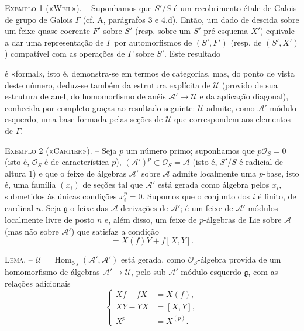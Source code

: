 \documentclass[11pt,twoside,openany]{book}
\numberwithin{equation}{section}
\newcommand{\src}[1]{%
  \phantomsection\hypertarget{src:#1}{}%
  \marginpar{\raggedleft\footnotesize\sffamily #1}%
}
\theoremstyle{plain}
\theoremstyle{definition}
\theoremstyle{remark}
\newcommand{\FgaUnitKey}{frontmatter}
\renewcommand{\src}[1]{%
  \phantomsection\hypertarget{src:\FgaUnitKey:#1}{}%
  \marginpar{\raggedleft\footnotesize\sffamily #1}%
}
\begin{document}
\textsc{Exemplo 1 («Weil»).} -- Suponhamos que $S'/S$ é um recobrimento étale
de Galois de grupo de Galois $\Gamma$ (cf. A, parágrafos 3 e 4.d). Então, um
dado de descida sobre um feixe quase-coerente $F'$ sobre $S'$ (resp. sobre um
$S'$-pré-esquema $X'$) equivale a dar uma representação de $\Gamma$ por
automorfismos de $(S',F')$ (resp. de $(S',X')$) compatível com as operações
de $\Gamma$ sobre $S'$. Este resultado

\src{321}
é «formal», isto é, demonstra-se em termos de categorias, mas, do
ponto de vista deste número, deduz-se também da estrutura explícita de
$\mathcal U$ (provido de sua estrutura de anel, do homomorfismo de anéis
$\mathcal A'\longrightarrow\mathcal U$ e da aplicação diagonal), conhecida
por completo graças ao resultado seguinte: $\mathcal U$ admite, como
$\mathcal A'$-módulo esquerdo, uma base formada pelas seções de
$\mathcal U$ que correspondem aos elementos de $\Gamma$.

\textsc{Exemplo 2 («Cartier»).} -- Seja $p$ um número primo; suponhamos que
$p\mathcal O_S=0$ (isto é, $\mathcal O_S$ é de característica $p$),
$(\mathcal A')^p\subset\mathcal O_S=\mathcal A$ (isto é, $S'/S$ é radicial
de altura 1) e que o feixe de álgebras $\mathcal A'$ sobre $\mathcal A$ admite
localmente uma $p$-base, isto é, uma família $(x_i)$ de seções tal que
$\mathcal A'$ está gerada como álgebra pelos $x_i$, submetidos às únicas
condições $x_i^p=0$. Supomos que o conjunto dos $i$ é finito, de
cardinal $n$. Seja $\mathfrak g$ o feixe das $\mathcal A$-derivações de
$\mathcal A'$; é um feixe de $\mathcal A'$-módulos localmente livre de posto
$n$ e, além disso, um feixe de $p$-álgebras de Lie sobre $\mathcal A$ (mas não sobre
$\mathcal A'$) que satisfaz a condição
\begin{equation}
  [X,fY]=X(f)Y+f[X,Y].
  \tag{3.5}
\end{equation}

\textsc{Lema.} -- $\mathcal U=
\operatorname{Hom}_{\mathcal O_S}(\mathcal A',\mathcal A')$ está gerada,
como $\mathcal O_S$-álgebra provida de um homomorfismo de álgebras
$\mathcal A'\longrightarrow\mathcal U$, pelo sub-$\mathcal A'$-módulo
esquerdo $\mathfrak g$, com as relações adicionais
\begin{equation}
  \left\{
  \begin{aligned}
    Xf-fX&=X(f),\\
    XY-YX&=[X,Y],\\
    X^p&=X^{(p)}.
  \end{aligned}
  \right.
  \tag{3.6}
\end{equation}
\end{document}
